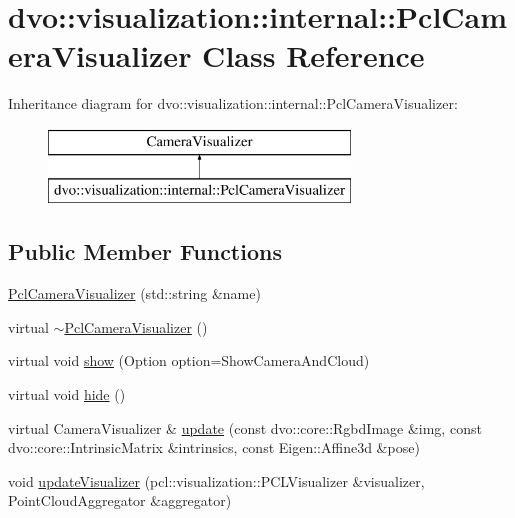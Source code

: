 \hypertarget{classdvo_1_1visualization_1_1internal_1_1_pcl_camera_visualizer}{}\section{dvo\+:\+:visualization\+:\+:internal\+:\+:Pcl\+Camera\+Visualizer Class Reference}
\label{classdvo_1_1visualization_1_1internal_1_1_pcl_camera_visualizer}
Inheritance diagram for dvo\+:\+:visualization\+:\+:internal\+:\+:Pcl\+Camera\+Visualizer\+:\begin{figure}[H]
\begin{center}
\leavevmode
\includegraphics[height=2.000000cm]{classdvo_1_1visualization_1_1internal_1_1_pcl_camera_visualizer}
\end{center}
\end{figure}
\subsection*{Public Member Functions}
\begin{DoxyCompactItemize}
\item 
\mbox{\hyperlink{classdvo_1_1visualization_1_1internal_1_1_pcl_camera_visualizer_a4990540496b6a8104b6f3d794ed2bb17}{Pcl\+Camera\+Visualizer}} (std\+::string \&name)
\item 
virtual \mbox{\hyperlink{classdvo_1_1visualization_1_1internal_1_1_pcl_camera_visualizer_a594001de77ac60de8cd05a03d1314b8e}{$\sim$\+Pcl\+Camera\+Visualizer}} ()
\item 
virtual void \mbox{\hyperlink{classdvo_1_1visualization_1_1internal_1_1_pcl_camera_visualizer_a09b5d8117f8ca15489ac42f6b6019030}{show}} (Option option=Show\+Camera\+And\+Cloud)
\item 
virtual void \mbox{\hyperlink{classdvo_1_1visualization_1_1internal_1_1_pcl_camera_visualizer_ad261307239a87bc10ba4d0662960cc72}{hide}} ()
\item 
virtual Camera\+Visualizer \& \mbox{\hyperlink{classdvo_1_1visualization_1_1internal_1_1_pcl_camera_visualizer_adfe2b8752f78ee0fa6ee193be70941eb}{update}} (const dvo\+::core\+::\+Rgbd\+Image \&img, const dvo\+::core\+::\+Intrinsic\+Matrix \&intrinsics, const Eigen\+::\+Affine3d \&pose)
\item 
void \mbox{\hyperlink{classdvo_1_1visualization_1_1internal_1_1_pcl_camera_visualizer_adbc6ea5a07dace4e06773d568986424b}{update\+Visualizer}} (pcl\+::visualization\+::\+P\+C\+L\+Visualizer \&visualizer, Point\+Cloud\+Aggregator \&aggregator)
\end{DoxyCompactItemize}


